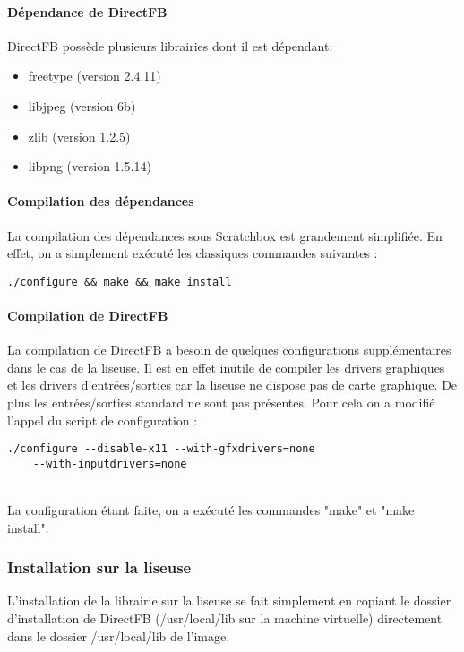\paragraph{Dépendance de DirectFB}
DirectFB possède plusieurs librairies dont il est dépendant: 
	\begin{itemize}
		\item freetype (version 2.4.11)
		\item libjpeg (version 6b)
		\item zlib (version 1.2.5)
		\item libpng (version 1.5.14)
	\end{itemize}

\paragraph{Compilation des dépendances \\}

La compilation des dépendances sous Scratchbox est grandement simplifiée. En effet, on a simplement exécuté les classiques commandes suivantes : 
	\begin{lstlisting}
./configure && make && make install
	\end{lstlisting}

\paragraph{Compilation de DirectFB \\}

La compilation de DirectFB a besoin de quelques configurations supplémentaires dans le cas de la liseuse. Il est en effet inutile de compiler les drivers graphiques et les drivers d'entrées/sorties car la liseuse ne dispose pas de carte graphique. De plus les entrées/sorties standard ne sont pas présentes.
Pour cela on a modifié l'appel du script de configuration : 
\begin{lstlisting}
./configure --disable-x11 --with-gfxdrivers=none 
	--with-inputdrivers=none
\end{lstlisting}
~\\
La configuration étant faite, on a exécuté les commandes "make" et "make install".

\subsubsection{Installation sur la liseuse}

L'installation de la librairie sur la liseuse se fait simplement en copiant le dossier d'installation de DirectFB 
(/usr/local/lib sur la machine virtuelle) directement dans le dossier /usr/local/lib de l'image.

